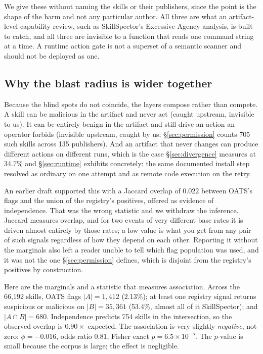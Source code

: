 \documentclass[10pt]{article}
\begin{document}
We give these without naming the skills or their publishers, since the point is the
shape of the harm and not any particular author. All three are what an artifact-level
capability review, such as SkillSpector's Excessive Agency analysis, is built to
catch, and all three are invisible to a function that reads one command string at a
time. A runtime action gate is not a superset of a semantic scanner and should not be
deployed as one.

\subsection{Why the blast radius is wider together}

Because the blind spots do not coincide, the layers compose rather than compete. A
skill can be malicious in the artifact and never act (caught upstream, invisible to
us). It can be entirely benign in the artifact and still drive an action an operator
forbids (invisible upstream, caught by us; \S\ref{sec:permission} counts 705 such
skills across 135 publishers). And an artifact that never changes can produce
different actions on different runs, which is the case
\S\ref{sec:divergence} measures at 34.7\% and \S\ref{sec:runtime} exhibits
concretely: the same documented install step resolved as ordinary on one attempt and
as remote code execution on the retry.

An earlier draft supported this with a Jaccard overlap of $0.022$ between OATS's flags
and the union of the registry's positives, offered as evidence of independence. That
was the wrong statistic and we withdraw the inference. Jaccard measures overlap, and
for two events of very different base rates it is driven almost entirely by those
rates; a low value is what you get from any pair of such signals regardless of how
they depend on each other. Reporting it without the marginals also left a reader
unable to tell which flag population was used, and it was not the one
\S\ref{sec:permission} defines, which is disjoint from the registry's positives by
construction.

Here are the marginals and a statistic that measures association. Across the 66,192
skills, OATS flags $|A| = 1{,}412$ (2.13\%); at least one registry signal returns
suspicious or malicious on $|B| = 35{,}361$ (53.4\%, almost all of it SkillSpector);
and $|A \cap B| = 680$. Independence predicts 754 skills in the intersection, so the
observed overlap is $0.90\times$ expected. The association is very slightly
\emph{negative}, not zero: $\phi = -0.016$, odds ratio $0.81$, Fisher exact
$p = 6.5 \times 10^{-5}$. The $p$-value is small because the corpus is large; the
effect is negligible.
\end{document}
